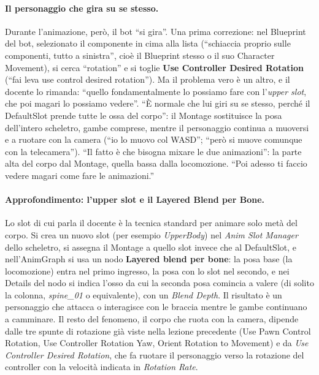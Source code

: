 \paragraph{Il personaggio che gira su se stesso.} Durante l'animazione, però, il bot
``si gira''. Una prima correzione: nel Blueprint del bot, selezionato il componente in
cima alla lista (``schiaccia proprio sulle componenti, tutto a sinistra'', cioè il
Blueprint stesso o il suo Character Movement), si cerca ``rotation'' e si toglie
\textbf{Use Controller Desired Rotation} (``fai leva use control desired rotation''). Ma
il problema vero è un altro, e il docente lo rimanda: ``quello fondamentalmente lo
possiamo fare con l'\emph{upper slot}, che poi magari lo possiamo vedere''. ``È normale che
lui giri su se stesso, perché il DefaultSlot prende tutte le ossa del corpo'': il
Montage sostituisce la posa dell'intero scheletro, gambe comprese, mentre il personaggio
continua a muoversi e a ruotare con la camera (``io lo muovo col WASD''; ``però si muove
comunque con la telecamera''). ``Il fatto è che bisogna mixare le due animazioni'': la
parte alta del corpo dal Montage, quella bassa dalla locomozione. ``Poi adesso ti faccio
vedere magari come fare le animazioni.''

\paragraph{Approfondimento: l'upper slot e il Layered Blend per Bone.} Lo slot di cui
parla il docente è la tecnica standard per animare solo metà del corpo. Si crea un nuovo
slot (per esempio \emph{UpperBody}) nel \emph{Anim Slot Manager} dello scheletro, si
assegna il Montage a quello slot invece che al DefaultSlot, e nell'AnimGraph si usa un
nodo \textbf{Layered blend per bone}: la posa base (la locomozione) entra nel primo
ingresso, la posa con lo slot nel secondo, e nei Details del nodo si indica l'osso da
cui la seconda posa comincia a valere (di solito la colonna, \emph{spine\_01} o
equivalente), con un \emph{Blend Depth}. Il risultato è un personaggio che attacca o
interagisce con le braccia mentre le gambe continuano a camminare. Il resto del
fenomeno, il corpo che ruota con la camera, dipende dalle tre spunte di rotazione già
viste nella lezione precedente (Use Pawn Control Rotation, Use Controller Rotation Yaw,
Orient Rotation to Movement) e da \emph{Use Controller Desired Rotation}, che fa ruotare
il personaggio verso la rotazione del controller con la velocità indicata in
\emph{Rotation Rate}.

